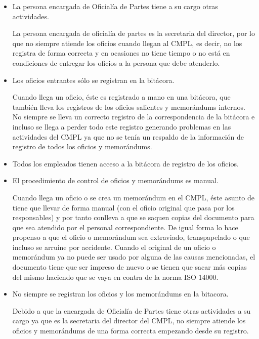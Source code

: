 	\begin{itemize}
	
	\item La persona encargada de Oficialía de Partes tiene a su cargo otras actividades.
	
La persona encargada de oficialía de partes es la secretaria del director, por lo que no siempre atiende los oficios cuando llegan al CMPL, es decir, no los registra de forma correcta y en ocasiones no tiene tiempo o no está en condiciones de entregar los oficios a la persona que debe atenderlo.


	\item Los oficios entrantes sólo se registran en la bitácora.	
	
Cuando llega un oficio, éste es registrado a mano en una bitácora, que también lleva los registros de los oficios salientes y memorándums internos. No siempre se lleva un correcto registro de la correspondencia de la bitácora e incluso se llega a perder todo este registro generando problemas en las actividades del CMPL ya que no se tenía un respaldo de la información de registro de todos los oficios y memorándums.

	\item Todos los empleados tienen acceso a la bitácora de registro de los oficios.
	
	\item El procedimiento de control de oficios y memorándums es manual.	
	
Cuando llega un oficio o se crea un memorándum en el CMPL, éste asunto de tiene que llevar de forma manual (con el oficio original que pasa por los responsables) y por tanto conlleva a que se saquen copias del documento para que sea atendido por el personal correspondiente. De igual forma lo hace propenso a que el oficio o memorándum sea extraviado, transpapelado o que incluso se arruine por accidente. Cuando el original de un oficio o memorándum ya no puede ser usado por alguna de las causas mencionadas, el documento tiene que ser impreso de nuevo o se tienen que sacar más copias del mismo haciendo que se vaya en contra de la norma ISO 14000.

	\item No siempre se registran los oficios y los memorándums en la bitacora.	
	
Debido a que la encargada de Oficialía de Partes tiene otras actividades a su cargo ya que es la secretaria del director del CMPL, no siempre atiende los oficios y memorándums de una forma correcta empezando desde su registro. 


\end{itemize}
